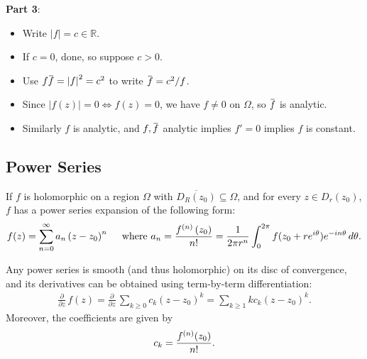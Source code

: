 \begin{solution}

\textbf{Part 3}:

\begin{itemize}
\tightlist
\item
  Write \({\left\lvert {f} \right\rvert} = c \in {\mathbb{R}}\).
\item
  If \(c=0\), done, so suppose \(c>0\).
\item
  Use
  \(f\mkern 1.5mu\overline{\mkern-1.5muf\mkern-1.5mu}\mkern 1.5mu = {\left\lvert {f} \right\rvert}^2 = c^2\)
  to write
  \(\mkern 1.5mu\overline{\mkern-1.5muf\mkern-1.5mu}\mkern 1.5mu=c^2/f\).
\item
  Since \({\left\lvert {f(z)} \right\rvert} = 0 \iff f(z) = 0\), we have
  \(f\neq 0\) on \(\Omega\), so
  \(\mkern 1.5mu\overline{\mkern-1.5muf\mkern-1.5mu}\mkern 1.5mu\) is
  analytic.
\item
  Similarly \(f\) is analytic, and
  \(f,\mkern 1.5mu\overline{\mkern-1.5muf\mkern-1.5mu}\mkern 1.5mu\)
  analytic implies \(f'=0\) implies \(f\) is constant.
\end{itemize}

\end{solution}


\hypertarget{power-series}{%
\subsection{Power Series}\label{power-series}}

\begin{theorem}

If \(f\) is holomorphic on a region \(\Omega\) with
\(\overline{ D_R(z_0)} \subseteq \Omega\), and for every
\(z\in D_r(z_0)\), \(f\) has a power series expansion of the following
form:
\begin{align*}
f(z)=\sum_{n=0}^{\infty} a_{n}\left(z-z_{0}\right)^{n} \quad\text{ where } a_{n}=\frac{f^{(n)}\left(z_{0}\right)}{n !}
= {1 \over 2\pi r^n}\int_0^{2\pi} f(z_0 + re^{i\theta})e^{-in\theta} \,d\theta
.\end{align*}

\end{theorem}

\begin{proposition}

Any power series is smooth (and thus holomorphic) on its disc of
convergence, and its derivatives can be obtained using term-by-term
differentiation:
\begin{align*}
{\frac{\partial }{\partial z}\,} f(z) = {\frac{\partial }{\partial z}\,} \sum_{k\geq 0} c_k (z-z_0)^k = \sum_{k\geq 1} kc_k (z-z_0)^k
.\end{align*}
Moreover, the coefficients are given by
\begin{align*}
c_k = {f^{(n)}(z_0) \over n! }
.\end{align*}

\end{proposition}


